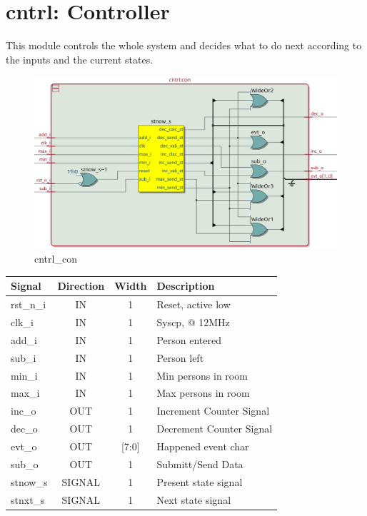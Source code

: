 \documentclass[12pt,a4 paper] {report}
\begin{document}
\newpage

\section{cntrl: Controller}
This module controls the whole system and decides what to do next according to the inputs and the current states.
\begin{figure}[h]
	\centering	
	\includegraphics[scale=0.25]{../png/cntrl_con.png}
	\caption{cntrl\_con}
\end{figure}
\begin{center}
	\begin{tabular}{ | p{2cm} | c | c | p{5cm} |}
		\hline
		\textbf{Signal} & \textbf{Direction} & \textbf{Width} & \textbf{Description} \\
		\hline
		\hline
		rst\_n\_i & IN & 1 & Reset, active low \\
		\hline
		clk\_i & IN & 1 & Syscp, @ 12MHz \\
		\hline
		add\_i & IN & 1 & Person entered \\
		\hline
		sub\_i & IN & 1 & Person left \\
		\hline
		min\_i & IN & 1 & Min persons in room \\
		\hline
		max\_i & IN & 1 & Max persons in room \\
		\hline
		inc\_o & OUT & 1 & Increment Counter Signal \\
		\hline
		dec\_o & OUT & 1 & Decrement Counter Signal \\
		\hline
		evt\_o & OUT & [7:0] & Happened event char \\
		\hline
		sub\_o & OUT & 1 & Submitt/Send Data \\
		\hline
		\hline
		stnow\_s & SIGNAL & 1 & Present state signal \\
		\hline
		stnxt\_s  & SIGNAL & 1 & Next state signal \\
		\hline	
	\end{tabular}
\end{center}
\end{document}
